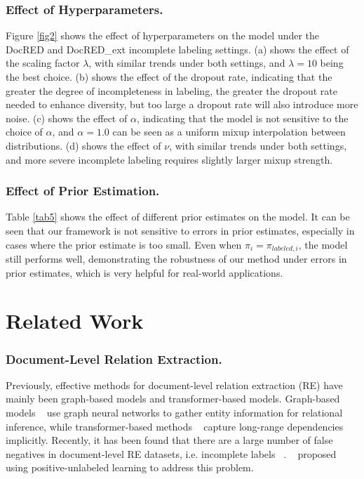 \documentclass[letterpaper]{article}
\begin{document}
\subsubsection{Effect of Hyperparameters.}
Figure \ref{fig2} shows the effect of hyperparameters on the model under the DocRED and DocRED\_ext incomplete labeling settings. (a) shows the effect of the scaling factor $\lambda$, with similar trends under both settings, and $\lambda=10$ being the best choice. (b) shows the effect of the dropout rate, indicating that the greater the degree of incompleteness in labeling, the greater the dropout rate needed to enhance diversity, but too large a dropout rate will also introduce more noise. (c) shows the effect of $\alpha$, indicating that the model is not sensitive to the choice of $\alpha$, and $\alpha=1.0$ can be seen as a uniform mixup interpolation between distributions. (d) shows the effect of $\nu$, with similar trends under both settings, and more severe incomplete labeling requires slightly larger mixup strength.

\subsubsection{Effect of Prior Estimation.}
Table \ref{tab5} shows the effect of different prior estimates on the model. It can be seen that our framework is not sensitive to errors in prior estimates, especially in cases where the prior estimate is too small. Even when $\pi_{i}=\pi_{labeled,i}$, the model still performs well, demonstrating the robustness of our method under errors in prior estimates, which is very helpful for real-world applications.

\section{Related Work}

\subsubsection{Document-Level Relation Extraction.}
Previously, effective methods for document-level relation extraction (RE) have mainly been graph-based models and transformer-based models. Graph-based models ~\cite{DBLP:conf/acl/NanGSL20,DBLP:conf/coling/LiYSXXZ20,DBLP:conf/emnlp/ZengXCL20, DBLP:conf/acl/ZengWC21, DBLP:conf/aaai/XuCZ21} use graph neural networks to gather entity information for relational inference, while transformer-based methods ~\cite{DBLP:conf/aaai/Zhou0M021,DBLP:conf/aaai/XuWLZM21,DBLP:conf/ijcai/ZhangCXDTCHSC21,DBLP:conf/acl/TanHBN22} capture long-range dependencies implicitly. Recently, it has been found that there are a large number of false negatives in document-level RE datasets, i.e. incomplete labels ~\cite{DBLP:conf/acl/HuangH0ZF022, DBLP:conf/emnlp/Tan0BNA22}. ~\cite{DBLP:conf/emnlp/WangLHZ22} proposed using positive-unlabeled learning to address this problem.
\end{document}
